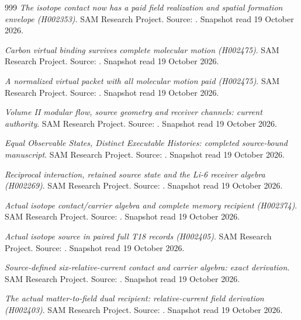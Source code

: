 \begin{thebibliography}{999}
 \emph{The isotope contact now has a paid field realization and spatial formation envelope (H002353)}. SAM Research Project. Source: . Snapshot read 19 October 2026.

 \emph{Carbon virtual binding survives complete molecular motion (H002475)}. SAM Research Project. Source: . Snapshot read 19 October 2026.

 \emph{A normalized virtual packet with all molecular motion paid (H002475)}. SAM Research Project. Source: . Snapshot read 19 October 2026.

 \emph{Volume II modular flow, source geometry and receiver channels: current authority}. SAM Research Project. Source: . Snapshot read 19 October 2026.

 \emph{Equal Observable States, Distinct Executable Histories: completed source-bound manuscript}. SAM Research Project. Source: . Snapshot read 19 October 2026.

 \emph{Reciprocal interaction, retained source state and the Li-6 receiver algebra (H002269)}. SAM Research Project. Source: . Snapshot read 19 October 2026.

 \emph{Actual isotope contact/carrier algebra and complete memory recipient (H002374)}. SAM Research Project. Source: . Snapshot read 19 October 2026.

 \emph{Actual isotope source in paired full T18 records (H002405)}. SAM Research Project. Source: . Snapshot read 19 October 2026.

 \emph{Source-defined six-relative-current contact and carrier algebra: exact derivation}. SAM Research Project. Source: . Snapshot read 19 October 2026.

 \emph{The actual matter-to-field dual recipient: relative-current field derivation (H002403)}. SAM Research Project. Source: . Snapshot read 19 October 2026.


\end{thebibliography}
